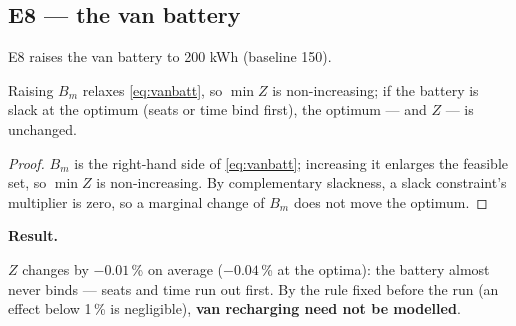 
\subsection{E8 --- the van battery}
\label{sec:e8}
E8 raises the van battery to 200 kWh (baseline 150).

\begin{proposition}
\label{prop:e8}
Raising $B_m$ relaxes \eqref{eq:vanbatt}, so $\min Z$ is non-increasing; if the battery is slack at the optimum
(seats or time bind first), the optimum --- and $Z$ --- is unchanged.
\end{proposition}
\begin{proof}
$B_m$ is the right-hand side of \eqref{eq:vanbatt}; increasing it enlarges the feasible set, so $\min Z$ is
non-increasing. By complementary slackness, a slack constraint's multiplier is zero, so a marginal change of
$B_m$ does not move the optimum.
\end{proof}

\textbf{Result.}
\begin{table}[H]\centering
\caption{E8. Van battery 200 kWh instead of 150.}

\end{table}
$Z$ changes by $-0.01$\,\% on average ($-0.04$\,\% at the optima): the battery almost never binds --- seats and
time run out first. By the rule fixed before the run (an effect below 1\,\% is negligible), \textbf{van recharging
need not be modelled}.



